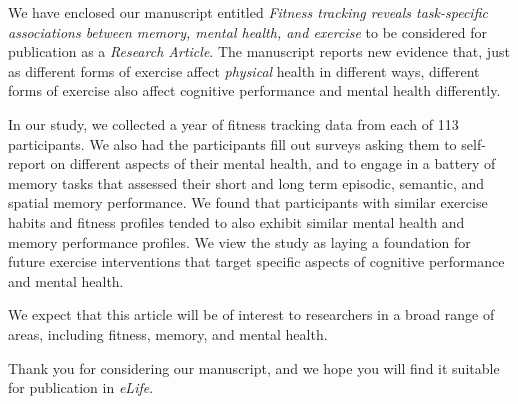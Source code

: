 \documentclass[11pt,stdletter,orderfromtodate,sigleft]{newlfm}
\begin{document}
\begin{newlfm}
We have enclosed our manuscript entitled \textit{Fitness tracking
  reveals task-specific associations between memory, mental health,
  and exercise} to be considered for publication as a
\textit{Research Article}.  The manuscript reports new evidence that, just as different
forms of exercise affect \textit{physical} health in different ways,
different forms of exercise also affect cognitive performance and
mental health differently.

In our study, we collected a year of fitness tracking data from each
of 113 participants.  We also had the participants fill out surveys
asking them to self-report on different aspects of their mental
health, and to engage in a battery of memory tasks that assessed their
short and long term episodic, semantic, and spatial memory
performance.  We found that participants with similar exercise habits
and fitness profiles tended to also exhibit similar mental health and
memory performance profiles.  We view the study as laying a foundation
for future exercise interventions that target specific aspects of
cognitive performance and mental health.


We expect that this article will be of interest to researchers in a
broad range of areas, including fitness, memory, and mental health.

Thank you for considering our manuscript, and we hope you will find it suitable for publication in \textit{eLife}.


\end{newlfm}
\end{document}
